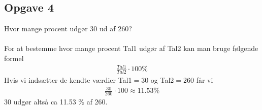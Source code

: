 \subsection{Opgave 4}

Hvor mange procent udgør 30 ud af 260?\\\\

\ans
For at bestemme hvor mange procent Tal1 udgør af Tal2 kan man bruge følgende formel
\begin{align*}
    \frac{Tal1}{Tal2}\cdot 100\%
\end{align*}
Hvis vi indsætter de kendte værdier Tal1$=30$ og Tal2$=260$ får vi
\begin{align*}
    \frac{30}{260}\cdot 100 \approx 11.53 \%
\end{align*}
30 udgør altså ca 11.53 \% af 260.
\vspace*{1cm}